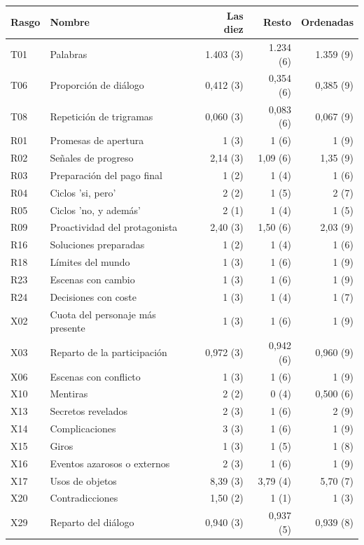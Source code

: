 \begin{tabular}{@{}l>{\raggedright\arraybackslash}p{4.8cm}rrr@{}}
\toprule
Rasgo & Nombre & Las diez & Resto & Ordenadas \\
\midrule
T01 & Palabras & 1.403 (3) & 1.234 (6) & 1.359 (9) \\
T06 & Proporción de diálogo & 0,412 (3) & 0,354 (6) & 0,385 (9) \\
T08 & Repetición de trigramas & 0,060 (3) & 0,083 (6) & 0,067 (9) \\
R01 & Promesas de apertura & 1 (3) & 1 (6) & 1 (9) \\
R02 & Señales de progreso & 2,14 (3) & 1,09 (6) & 1,35 (9) \\
R03 & Preparación del pago final & 1 (2) & 1 (4) & 1 (6) \\
R04 & Ciclos 'si, pero' & 2 (2) & 1 (5) & 2 (7) \\
R05 & Ciclos 'no, y además' & 2 (1) & 1 (4) & 1 (5) \\
R09 & Proactividad del protagonista & 2,40 (3) & 1,50 (6) & 2,03 (9) \\
R16 & Soluciones preparadas & 1 (2) & 1 (4) & 1 (6) \\
R18 & Límites del mundo & 1 (3) & 1 (6) & 1 (9) \\
R23 & Escenas con cambio & 1 (3) & 1 (6) & 1 (9) \\
R24 & Decisiones con coste & 1 (3) & 1 (4) & 1 (7) \\
X02 & Cuota del personaje más presente & 1 (3) & 1 (6) & 1 (9) \\
X03 & Reparto de la participación & 0,972 (3) & 0,942 (6) & 0,960 (9) \\
X06 & Escenas con conflicto & 1 (3) & 1 (6) & 1 (9) \\
X10 & Mentiras & 2 (2) & 0 (4) & 0,500 (6) \\
X13 & Secretos revelados & 2 (3) & 1 (6) & 2 (9) \\
X14 & Complicaciones & 3 (3) & 1 (6) & 1 (9) \\
X15 & Giros & 1 (3) & 1 (5) & 1 (8) \\
X16 & Eventos azarosos o externos & 2 (3) & 1 (6) & 1 (9) \\
X17 & Usos de objetos & 8,39 (3) & 3,79 (4) & 5,70 (7) \\
X20 & Contradicciones & 1,50 (2) & 1 (1) & 1 (3) \\
X29 & Reparto del diálogo & 0,940 (3) & 0,937 (5) & 0,939 (8) \\
\bottomrule
\end{tabular}
